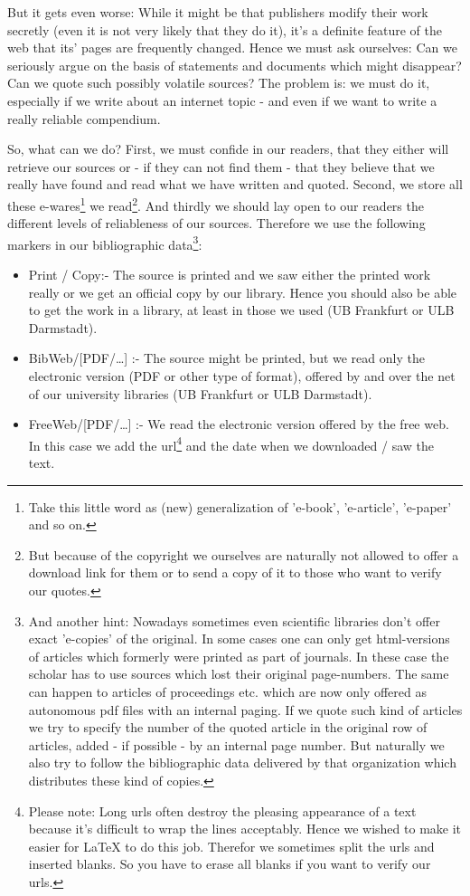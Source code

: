 But it gets even worse: While it might be that publishers modify their work
secretly (even it is not very likely that they do it), it's a definite feature
of the web that its' pages are fre\-quen\-tly changed. Hence we must ask
ourselves: Can we seriously argue on the basis of statements and documents which
might disappear? Can we quote such possibly volatile sources? The problem is: we
must do it, especially if we write about an internet topic - and even if we want
to write a really reliable compendium.

So, what can we do? First, we must confide in our readers, that they either
will retrieve our sources or - if they can not find them - that they
believe that we really have found and read what we have written and
quoted. Second, we store all these e-wares\footnote{Take this little word as
(new) generalization of 'e-book', 'e-article', 'e-paper' and so on.} we
read\footnote{But because of the copyright we ourselves are naturally not
allowed to offer a download link for them or to send a copy of it to those who
want to verify our quotes.}. And thirdly we should lay open to our readers the
different levels of reliableness of our sources. Therefore we use
the following markers in our bibliographic data\footnote{And another hint: Nowadays sometimes
even scientific libraries don't offer exact 'e-copies' of the original. In
some cases one can only get html-versions of articles which formerly were
printed as part of journals. In these case the scholar has to use sources which
lost their original page-numbers. The same can happen to articles of proceedings
etc. which are now only offered as autonomous pdf files with an internal paging.
If we quote such kind of articles we try to specify the number of the quoted
article in the original row of articles, added - if possible - by an internal
page number. But naturally we also try to follow the bibliographic data
delivered by that organization which distributes these kind of copies.}:

\begin{itemize}
  \item Print / Copy:- The source is printed and we saw either the printed work
  really or we get an official copy by our library. Hence you should also be able
  to get the work in a library, at least in those we used (UB Frankfurt or ULB
  Darmstadt).
  \item BibWeb/[PDF/\ldots] :- The source might be printed, but we read only the
  electronic version (PDF or other type of format), offered by and over the
  net of our university libraries (UB Frankfurt or ULB Darmstadt).
  \item FreeWeb/[PDF/\ldots] :- We read the electronic version offered by the
  free web. In this case we add the url\footnote{Please note: Long urls often
  destroy the pleasing appearance of a text because it's difficult to wrap the
  lines acceptably. Hence we wished to make it easier for LaTeX to do this job.
  Therefor we sometimes split the urls and inserted blanks. So you have to erase
  all blanks if you want to verify our urls.} and the date when we downloaded /
  saw the text.
\end{itemize}


%
